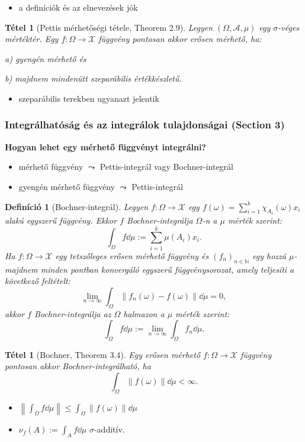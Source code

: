 \documentclass{beamer} %
\newtheorem{theo}[lem]{Tétel}
\newtheorem{defi}[lem]{Definíció}
\begin{document}
\begin{frame}
\justifying
\begin{itemize}
\item a definíciók és az elnevezések jók
\end{itemize}
\pause 
\begin{theo}[Pettis mérhetőségi tétele, Theorem 2.9] Legyen $(\Omega,\mathcal{A},\mu)$ egy $\sigma$-véges mértéktér. Egy $f \colon \Omega \to \mathcal{X}$ függvény pontosan akkor erősen mérhető, ha:

a) gyengén mérhető és

b) majdnem mindenütt szeparábilis értékkészletű.
\end{theo}
\begin{itemize}
\pause \item szeparábilis terekben ugyanazt jelentik
\end{itemize}
\end{frame}

\begin{frame}
\frametitle{Integrálhatóság és az integrálok tulajdonságai (Section 3)}
\textbf{Hogyan lehet egy mérhető függvényt integrálni?}
\begin{itemize}
\pause \item mérhető függvény $\leadsto$ Pettis-integrál vagy Bochner-integrál
\pause \item gyengén mérhető függvény $\leadsto$ Pettis-integrál
\end{itemize}
\end{frame}

\begin{frame}
\justifying
\begin{defi}[Bochner-integrál] Legyen $f \colon \Omega \to \mathcal{X}$ egy $f(\omega) = \sum^{k}_{i=1} \chi_{A_i}(\omega) x_i$ alakú egyszerű függvény. Ekkor $f$ Bochner-integrálja $\Omega$-n a $\mu$ mérték szerint:
$$\int_{\Omega} f \dd{\mu} := \sum^{k}_{i=1} \mu(A_i) x_i.$$
Ha $f \colon \Omega \to \mathcal{X}$ egy tetszőleges erősen mérhető függvény és $(f_n)_{n \in \mathbb{N}}$ egy hozzá $\mu$-majdnem minden pontban konvergáló egyszerű függvénysorozat, amely teljesíti a következő feltételt:
$$\lim_{n \to \infty}\int_{\Omega} \| f_n(\omega) - f(\omega) \| \dd{\mu} = 0,$$
akkor $f$ Bochner-integrálja az $\Omega$ halmazon a $\mu$ mérték szerint:
$$\int_{\Omega} f \dd{\mu} := \lim_{n \to \infty} \int_{\Omega} f_n \dd{\mu}.$$
\end{defi}
\end{frame}

\begin{frame}
\justifying
\begin{theo}[Bochner, Theorem 3.4] Egy erősen mérhető $f \colon \Omega \to \mathcal{X}$ függvény pontosan akkor Bochner-integrálható, ha
$$\int_{\Omega} \| f(\omega) \| \dd{\mu} < \infty.$$
\end{theo}
\begin{itemize}
\pause \item $\left \| \int_{\Omega} f \dd{\mu} \right\| \leqslant \int_{\Omega} \| f(\omega) \| \dd{\mu}$
\pause \item $\nu_f(A) := \int_{A} f \dd{\mu}$ $\sigma$-additív.
\end{itemize}
\end{frame}
\end{document}
